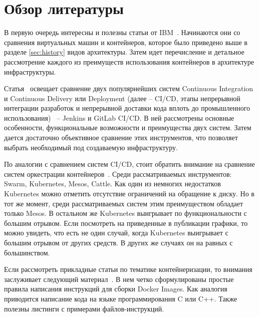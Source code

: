 \section{Обзор литературы}
\label{sec:lit-rev}

В первую очередь интересны и полезны статьи от IBM~\cite{ibm:containers1}\cite{ibm:containers2}. Начинаются они со сравнения виртуальных машин и контейнеров, которое было приведено выше в разделе \ref{sec:history} видов архитектуры. Затем идет перечисление и детальное рассмотрение каждого из преимуществ использования контейнеров в архитектуре инфраструктуры.

Статья~\cite{habr:ruvds:jenkins-vs-gitlab} освещает сравнение двух популярнейших систем Continuous Integration и Continuous Delivery или Deployment (далее -- CI/CD, этапы непрерывной интеграции разработок и непрерывной доставки кода вплоть до промышленного использования)~\cite{habr:flant:k8s-and-gitlab}
-- Jenkins и GitLab CI/CD. В ней рассмотрены основные особенности, функциональные возможности и преимущества двух систем. Затем дается достаточно объективное сравнение этих инструментов, что позволяет выбрать необходимый под создаваемую инфраструктуру.

По аналогии с сравнением систем CI/CD, стоит обратить внимание на сравнение систем оркестрации контейнеров~\cite{al2019container}. Среди рассматриваемых инструментов: Swarm, Kubernetes,
Mesos, Cattle. Как один из немногих недостатков Kubernetes можно отметить отсутствие ограничений на обращение к диску. Но в тот же момент, среди рассматриваемых систем этим преимуществом обладает только Mesos. В остальном же Kubernetes выигрывает по функциональности с большим отрывом. Если посмотреть на приведенные в публикации графики, то можно увидеть, что есть не один случай, когда Kubernetes выигрывает с большим отрывом от других средств. В других же случаях он на равных с большинством.

Если рассмотреть прикладные статьи по тематике контейнеризации, то внимания заслуживает следующий материал~\cite{nust2020ten}. В нем четко сформулированы простые правила написания инструкций для сборки Docker Images. Как аналогия приводится написание кода на языке программирования C или C++. Также полезны листинги с примерами файлов-инструкций.

